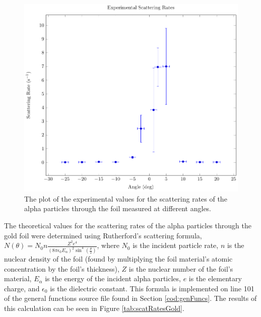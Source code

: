 \documentclass[a4paper]{article}
\begin{document}
\begin{figure}[H]
  \begin{center}
    \includegraphics[scale=0.8]{Plots/ExperimentalScatteringRates/expScatRates.pdf}
  \end{center}
  \caption{The plot of the experimental values for the scattering rates of the
    alpha particles through the foil measured at different angles.}
  \label{gph:expScatRatesGold}
\end{figure}

\qq 

\qq The theoretical values for the scattering rates of the alpha particles
through the gold foil were determined using Rutherford's scattering formula, \(
N (\theta) = N_0 n \frac{Z^2 e^4}{(8 \pi \epsilon_0 E_{\alpha})^2 \sin^4
  \left( \frac{\theta}{2} \right)} \), where \( N_0 \) is the incident particle
rate, \( n \) is the nuclear density of the foil (found by multiplying the
foil material's atomic concentration by the foil's thickness), \( Z \) is the
nuclear number of the foil's material, \( E_{\alpha} \) is the energy of the
incident alpha particles, \( e \) is the elementary charge, and \( \epsilon_0 \)
is the dielectric constant. This formula is implemented on line 101 of the
general functions source file found in Section \ref{cod:genFuncs}. The results
of this calculation can be seen in Figure \ref{tab:scatRatesGold}.
\end{document}

